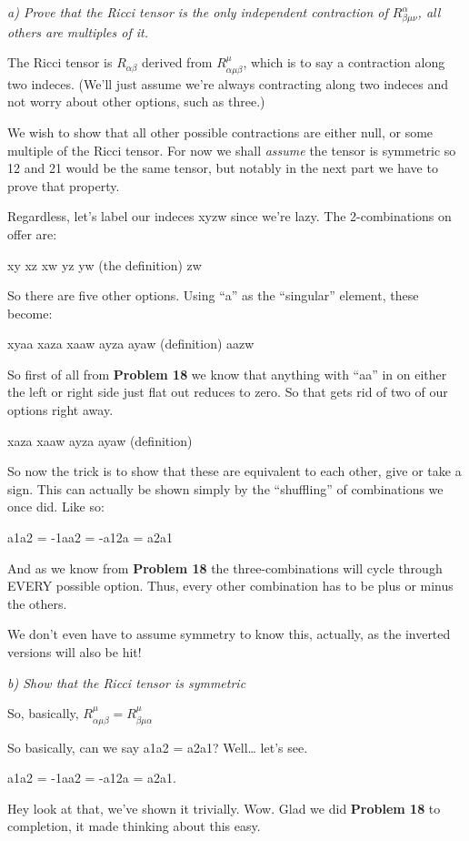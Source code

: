 \documentclass[landscape,letterpaper,10pt,english]{article}
\begin{document}
\[\label{P25}\]

\emph{a) Prove that the Ricci tensor is the only independent contraction
of \(R^\alpha_{\beta\mu\nu}\), all others are multiples of it.}

    The Ricci tensor is \(R_{\alpha\beta}\) derived from
\(R^\mu_{\alpha\mu\beta}\), which is to say a contraction along two
indeces. (We'll just assume we're always contracting along two indeces
and not worry about other options, such as three.)

We wish to show that all other possible contractions are either null, or
some multiple of the Ricci tensor. For now we shall \emph{assume} the
tensor is symmetric so 12 and 21 would be the same tensor, but notably
in the next part we have to prove that property.

Regardless, let's label our indeces xyzw since we're lazy. The
2-combinations on offer are:

xy xz xw yz yw (the definition) zw

So there are five other options. Using ``a'' as the ``singular''
element, these become:

xyaa xaza xaaw ayza ayaw (definition) aazw

So first of all from \textbf{Problem 18} we know that anything with
``aa'' in on either the left or right side just flat out reduces to
zero. So that gets rid of two of our options right away.

xaza xaaw ayza ayaw (definition)

So now the trick is to show that these are equivalent to each other,
give or take a sign. This can actually be shown simply by the
``shuffling'' of combinations we once did. Like so:

a1a2 = -1aa2 = -a12a = a2a1

And as we know from \textbf{Problem 18} the three-combinations will
cycle through EVERY possible option. Thus, every other combination has
to be plus or minus the others.

We don't even have to assume symmetry to know this, actually, as the
inverted versions will also be hit!

    \emph{b) Show that the Ricci tensor is symmetric}

So, basically, \(R^\mu_{\alpha\mu\beta} = R^\mu_{\beta\mu\alpha}\)

    So basically, can we say a1a2 = a2a1? Well\ldots{} let's see.

a1a2 = -1aa2 = -a12a = a2a1.

Hey look at that, we've shown it trivially. Wow. Glad we did
\textbf{Problem 18} to completion, it made thinking about this easy.
\end{document}
